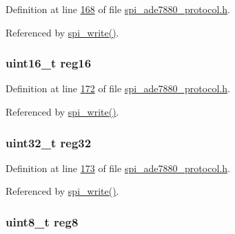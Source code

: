 Definition at line \hyperlink{a00041_source_l00168}{168} of file \hyperlink{a00041_source}{spi\-\_\-ade7880\-\_\-protocol.\-h}.



Referenced by \hyperlink{a00040_source_l00221}{spi\-\_\-write()}.

\hypertarget{a00020_a0c22d234d52e616d449a8c264bf2030b}{
\subsubsection[{reg16}]{\setlength{\rightskip}{0pt plus 5cm}uint16\-\_\-t reg16}}\label{db/db2/a00020_a0c22d234d52e616d449a8c264bf2030b}


Definition at line \hyperlink{a00041_source_l00172}{172} of file \hyperlink{a00041_source}{spi\-\_\-ade7880\-\_\-protocol.\-h}.



Referenced by \hyperlink{a00040_source_l00221}{spi\-\_\-write()}.

\hypertarget{a00020_a83e2be8d3feb1bcbc286bfaae10ac552}{
\subsubsection[{reg32}]{\setlength{\rightskip}{0pt plus 5cm}uint32\-\_\-t reg32}}\label{db/db2/a00020_a83e2be8d3feb1bcbc286bfaae10ac552}


Definition at line \hyperlink{a00041_source_l00173}{173} of file \hyperlink{a00041_source}{spi\-\_\-ade7880\-\_\-protocol.\-h}.



Referenced by \hyperlink{a00040_source_l00221}{spi\-\_\-write()}.

\hypertarget{a00020_a90b3f782e917edca7101e7803a3773b7}{
\subsubsection[{reg8}]{\setlength{\rightskip}{0pt plus 5cm}uint8\-\_\-t reg8}}\label{db/db2/a00020_a90b3f782e917edca7101e7803a3773b7}



